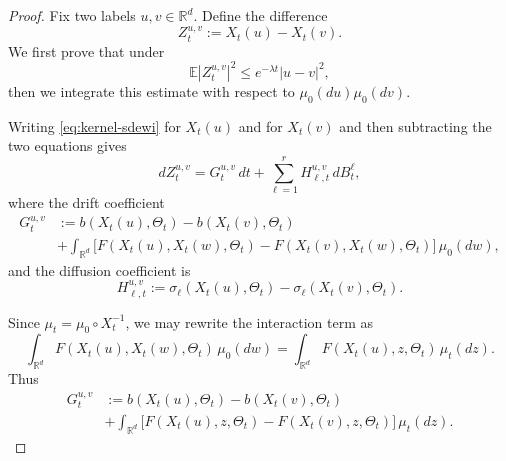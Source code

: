 \documentclass{tsp-short}
\theoremstyle{remark}
\theoremstyle{definition}
\newcommand{\R}{\mathbb{R}} %
\newcommand{\E}{\mathbb E} %
\begin{document}
\begin{proof}
	Fix two labels \(u,v\in\R^d\). Define the difference
	\begin{equation*}
		Z_t^{u,v}:=X_t(u)-X_t(v).
	\end{equation*}
	We first prove that under 
	\begin{equation*}
		\E|Z_t^{u,v}|^2 \le e^{-\lambda t}|u-v|^2,
	\end{equation*}
	then we integrate this estimate with respect to \(\mu_0(du)\mu_0(dv)\).

	Writing \eqref{eq:kernel-sdewi} for \(X_t(u)\) and for \(X_t(v)\) and then subtracting the two equations gives
	\begin{equation*}
		dZ_t^{u,v} = G_t^{u,v}\,dt + \sum_{\ell=1}^r H_{\ell,t}^{u,v}\,dB_t^\ell,
	\end{equation*}
	where the drift coefficient
	\begin{align*}
		G_t^{u,v} & := b(X_t(u),\Theta_t)-b(X_t(v),\Theta_t)                                                    \\
		          & +  \int_{\R^d} \big[ F(X_t(u),X_t(w),\Theta_t) - F(X_t(v),X_t(w),\Theta_t)\big]\,\mu_0(dw),
	\end{align*}
	and the diffusion coefficient is
	\begin{equation*}
		H_{\ell,t}^{u,v} := \sigma_\ell(X_t(u),\Theta_t) - \sigma_\ell(X_t(v),\Theta_t).
	\end{equation*}

	Since \(\mu_t =\mu_0\circ X_t^{-1}\), we may rewrite the interaction term as
	\begin{equation*}
		\int_{\R^d}F(X_t(u),X_t(w),\Theta_t)\,\mu_0(dw) = \int_{\R^d}F(X_t(u),z,\Theta_t)\,\mu_t(dz).
	\end{equation*}
	Thus
	\begin{align*}
		G_t^{u,v} & := b(X_t(u),\Theta_t)-b(X_t(v),\Theta_t)                                          \\
		          & + \int_{\R^d} \big[ F(X_t(u),z,\Theta_t) - F(X_t(v),z,\Theta_t) \big]\,\mu_t(dz).
	\end{align*}


\end{proof}
\end{document}
